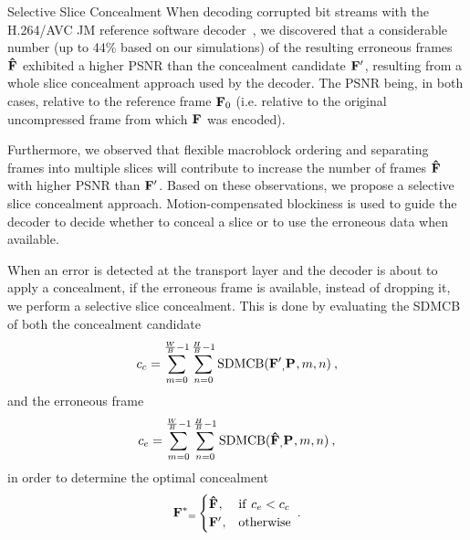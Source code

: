 \documentclass{article}
\newcommand{\ltCodec}{H.264/AVC JM reference software}
\begin{document}
\vspace{-0.5em}\begin{section}{Selective Slice Concealment} \vspace{-0.5em}
\newcommand{\ltSDMCB}[1]{\textrm{SDMCB}(#1,\ltP{},m,n)}
\label{section-selective-slice-concealment} %
When decoding corrupted bit streams with the \ltCodec{} decoder~\cite{JM}, we
discovered that a considerable number (up to 44\% based on our simulations) of 
the resulting erroneous frames $\mathbf{\hat{F}}_{}$ exhibited a higher PSNR than 
the 
concealment candidate $\mathbf{F^{\prime}}_{}$, resulting from a whole slice
concealment approach used by the decoder. The PSNR being, in both cases, 
relative to the reference frame
$\mathbf{F}_{0}$ (i.e. relative to the original uncompressed frame from which $\mathbf{F}_{}$ 
was encoded).

Furthermore, we observed that flexible macroblock ordering and separating frames
into multiple slices will contribute to increase the number of frames 
$\mathbf{\hat{F}}_{}$ with higher PSNR than $\mathbf{F^{\prime}}_{}$. Based on these 
observations,
we propose a selective slice concealment approach. Motion-compensated
blockiness is used to guide the decoder to decide whether to conceal a slice or
to use the erroneous data when available. 

When an error is detected at the transport layer and the decoder is about to 
apply a concealment, if the erroneous frame is available, instead of dropping 
it, we perform a selective slice concealment. This is done by evaluating the 
SDMCB of both the concealment candidate
\begin{equation*}
\label{eq-ConcealmentCandidate}
c_c=\sum_{m=0}^{\frac{W}{B}-1}\sum_{n=0}^{\frac{H}{B}-1}\ltSDMCB{\ltConc}\:,
\end{equation*}
and the erroneous frame
\begin{equation*}
\label{eq-ErroneousCandidate}
c_e=\sum_{m=0}^{\frac{W}{B}-1}\sum_{n=0}^{\frac{H}{B}-1}\ltSDMCB{\ltErr}\:,
\end{equation*}
in order to determine the optimal concealment
\begin{equation*}
\label{eq-SelectiveConcealment}
\mathbf{F^{*}}_{=}
\begin{cases}
\mathbf{\hat{F}}_{}, & \mathrm{if~} c_e < c_c\\
\mathbf{F^{\prime}}_{}, & \mathrm{otherwise}
\end{cases}\:.
\end{equation*}
\end{section}
\end{document}
